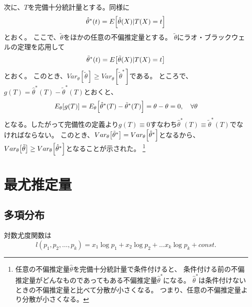 次に、\(T\)を完備十分統計量とする。同様に
\begin{equation}
  \hat{\theta}^{*}(t) = E \qty [\hat{\theta}(X) | T(X) = t]
\end{equation}
とおく。
ここで、\(\tilde{\theta}\)をほかの任意の不偏推定量とする。
\(\tilde{\theta}\)にラオ・ブラックウェルの定理を応用して
\begin{equation}
  \tilde{\theta}^{*}(t) = E \qty [\tilde{\theta}(X) | T(X) = t]
\end{equation}
とおく。
このとき、\(Var_{\theta} [\tilde{\theta}] \geq Var_{\theta} [\tilde{\theta}^{*}]\)である。
ところで、\(g(T) = \hat{\theta}^{*}(T) - \tilde{\theta}^{*}(T)\)とおくと、
\begin{equation}
  E_{\theta} \qty [g(T)] = E_{\theta} \qty [\hat{\theta}^{*}(T) - \tilde{\theta}^{*}(T)] = \theta - \theta = 0, \quad \forall \theta 
\end{equation}
となる。したがって完備性の定義より\(g(T) \equiv 0\)すなわち\(\hat{\theta}^{*}(T) \equiv \tilde{\theta}^{*}(T)\)でなければならない。
このとき、\(Var_{\theta} \qty [\tilde{\theta}^{*}] = Var_{\theta} \qty [\hat{\theta}^{*}]\)となるから、
\(Var_{\theta} \qty [\tilde{\theta}] \geq Var_{\theta} \qty [\hat{\theta}^{*}]\)となることが示された。
\footnote{任意の不偏推定量\(\hat{\theta}\)を完備十分統計量で条件付けると、
  条件付ける前の不偏推定量がどんなものであってもある不偏推定量\(\hat{\theta}^{*}\)になる。
  \(\hat{\theta}^{*}\)は条件付けないときの不偏推定量と比べて分散が小さくなる。
  つまり、任意の不偏推定量より分散が小さくなる。}


\section{最尤推定量}

\subsection{多項分布}

対数尤度関数は
\begin{equation}
  l(p_1, p_2, \dots, p_k) = x_1 \log p_1 + x_2 \log p_2 + \dots x_k \log p_k + const.
\end{equation}

